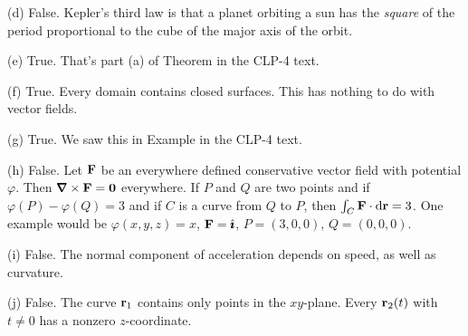 \begin{solution}
(d) False. Kepler's third law is that a planet orbiting a sun has 
the \emph{square} of the period proportional to the cube of the 
major axis of the orbit.

(e) True. That's part (a) of Theorem 
in the CLP-4 text.

(f) True. Every domain contains closed surfaces. This has nothing to do
with vector fields.

(g) True. We saw this in Example  in the CLP-4 text.

(h) False. Let $\mathbf{F}$ be an everywhere defined conservative vector field 
with potential $\varphi$. Then $\vnabla\times\vF=\vZero$ everywhere.
If $P$ and $Q$ are two points and if $\varphi(P)-\varphi(Q)=3$ and 
if $C$ is a curve from $Q$ to $P$, then $\int_C \mathbf{F} \cdot \mathrm{d}\mathbf{r} = 3$. 
One example would be $\varphi(x,y,z) = x$, $\mathbf{F}=\hat{\pmb{\imath}}$, $P=(3,0,0)$, $Q=(0,0,0)$.

(i) False. The normal component of acceleration  depends on speed,
as well as curvature.

(j) False. The curve $\mathbf{r}_1$ contains only points in the $xy$-plane. 
Every $\mathbf{r}_2(t)$ with $t\ne 0$  has a nonzero $z$-coordinate.

\end{solution}

